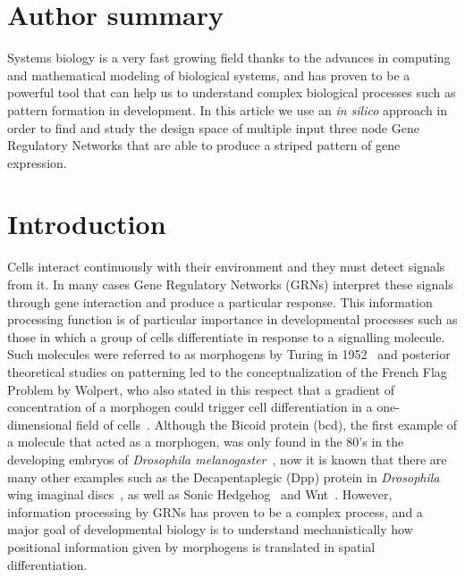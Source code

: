 \documentclass[10pt,letterpaper]{article}
\begin{document}
\section*{Author summary}
Systems biology is a very fast growing field thanks to the advances in computing and
mathematical modeling of biological systems, and has proven to be a powerful tool that
can help us to understand complex biological processes such as pattern formation in
development. In this article we use an \textit{in silico} approach in order to find and study
the design space of multiple input three node Gene Regulatory Networks that are able
to produce a striped pattern of gene expression.

\linenumbers

\section*{Introduction}

Cells interact continuously with their environment and they must detect signals
from it. In many cases Gene Regulatory Networks (GRNs) interpret these signals
through gene interaction and produce a particular response. This information
processing function is of particular importance in developmental processes such
as those in which a group of cells differentiate in response to a signalling
molecule. Such molecules were referred to as morphogens by Turing in
1952~\cite{Turing1952} and posterior theoretical studies on patterning led to the
conceptualization of the French Flag Problem by Wolpert, who also stated
in this respect that a gradient of concentration of a morphogen could
trigger cell differentiation in a one-dimensional field of cells~\cite{Wolpert1969,
sharpe_2019}.
Although the Bicoid protein (bcd), the first example of a molecule that acted
as a morphogen, was only found in the 80's in the developing embryos of
\textit{Drosophila melanogaster}~\cite{driever_gradient_1988,
driever_bicoid_1988}, now it is known that there
are many other examples such as the Decapentaplegic (Dpp) protein in
\textit{Drosophila} wing imaginal discs~\cite{affolter_decapentaplegic_2007},
as well as Sonic Hedgehog~\cite{dessaud_dynamic_2010,cohen_theoretical_2014}
and Wnt~\cite{raspopovic_digit_2014}. However, information processing by GRNs
has proven to be a complex process, and a major goal of developmental biology
is to understand mechanistically how positional information given by morphogens
is translated in spatial differentiation.\\
\end{document}
